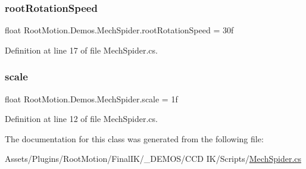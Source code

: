 \subsubsection{\texorpdfstring{root\+Rotation\+Speed}{rootRotationSpeed}}
{\footnotesize\ttfamily float Root\+Motion.\+Demos.\+Mech\+Spider.\+root\+Rotation\+Speed = 30f}



Definition at line 17 of file Mech\+Spider.\+cs.

\mbox{\label{class_root_motion_1_1_demos_1_1_mech_spider_a4b5c11a7eb6b181ea183fcd760c7417b}} 
\subsubsection{\texorpdfstring{scale}{scale}}
{\footnotesize\ttfamily float Root\+Motion.\+Demos.\+Mech\+Spider.\+scale = 1f}



Definition at line 12 of file Mech\+Spider.\+cs.



The documentation for this class was generated from the following file\+:\begin{DoxyCompactItemize}
\item 
Assets/\+Plugins/\+Root\+Motion/\+Final\+I\+K/\+\_\+\+D\+E\+M\+O\+S/\+C\+C\+D I\+K/\+Scripts/\mbox{\hyperlink{_mech_spider_8cs}{Mech\+Spider.\+cs}}\end{DoxyCompactItemize}
